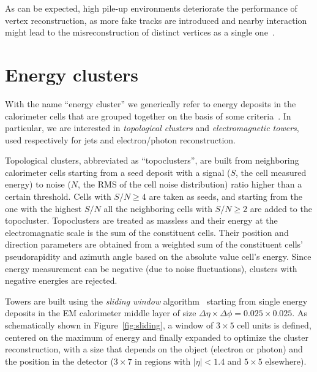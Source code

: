 As can be expected, high pile-up environments deteriorate the performance of vertex reconstruction,
as more fake tracks are introduced and nearby interaction might lead to the misreconstruction
of distinct vertices as a single one~\cite{ATLAS-CONF-2012-042}.



\section{Energy clusters}\label{sec:clusters}

With the name ``energy cluster'' we generically refer to energy deposits in the calorimeter
cells that are grouped together on the basis of some criteria~\cite{topocluster}.
In particular, we are interested in {\it topological clusters} and {\it electromagnetic towers},
used respectively for jets and electron/photon reconstruction.

Topological clusters, abbreviated as ``topoclusters'', are 
built from neighboring calorimeter cells starting from a seed deposit with a signal 
($S$, the cell measured energy) to noise ($N$, the RMS of the cell noise distribution) ratio
higher than a certain threshold. Cells with $S/N\geq 4$ are taken as seeds, and starting from the
one with the highest $S/N$ all the neighboring cells with $S/N\geq 2$ are added to the topocluster.
Topoclusters are treated as massless and their energy at the electromagnatic 
scale is the sum of the constituent cells. Their position and direction parameters
are obtained from a weighted sum of the constituent cells' pseudorapidity and azimuth angle
based on the absolute value cell's energy. Since energy measurement can be negative (due to
noise fluctuations), clusters with negative energies are rejected.

Towers are built using the {\it sliding window} algorithm~\cite{eperf} starting from
single energy deposits in the EM calorimeter middle layer of size
$\Delta\eta\times\Delta\phi=0.025\times0.025$. As schematically shown in Figure~\ref{fig:sliding},
a window of  $3\times5$ cell units is defined, centered on the maximum of
energy and finally expanded to optimize the cluster reconstruction, with a size
that depends on the object (electron or photon) and the position in the detector
($3\times7$ in regions with $|\eta|<1.4$ and $5\times5$ elsewhere).

